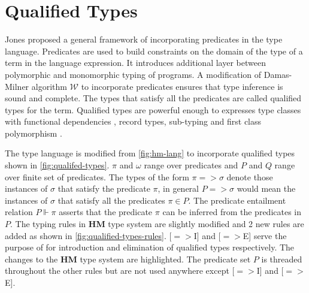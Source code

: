\section{Qualified Types}\label{sec:qualified-types}
Jones \citeyearpar{jones_theory_1994} proposed a general framework of incorporating predicates in the type language.
Predicates are used to build constraints on the domain of the type of a term in the language expression.
It introduces additional layer between polymorphic and monomorphic typing of programs.
A modification of Damas-Milner algorithm $\mathcal{W}$ to incorporate predicates ensures that type inference
is sound and complete. The types that satisfy all the predicates are called qualified types for the term.
Qualified types are powerful enough to expresses type classes with functional dependencies \citep{mark_type_2000},
record types, sub-typing \citep{jones_theory_1994} and first class polymorphism \citep{jones_first-class_1997}.

The type language is modified from \cref{fig:hm-lang} to incorporate
qualified types shown in \cref{fig:qualifed-types}. $\pi$ and $\omega$ range over predicates and  $P$ and $Q$ range over finite set of predicates.
The types of the form $\pi => \sigma$ denote those instances of $\sigma$ that satisfy the predicate $\pi$, in general
$P => \sigma$ would mean the instances of $\sigma$ that satisfy all the predicates $\pi \in P$. The predicate entailment
relation $P \Vdash \pi$ asserts that the predicate $\pi$ can be inferred from the predicates in $P$.
The typing rules in \textbf{HM} type system are slightly modified and 2 new rules are added
as shown in \cref{fig:qualified-types-rules}. [$=>$I] and [$=>$E] serve the purpose of for introduction and elimination of qualified types respectively.
The changes to the \textbf{HM} type system are \colorbox{blue!30}{highlighted}. The predicate set $P$ is threaded throughout the other rules
but are not used anywhere except [$=>$I] and [$=>$E]. %

